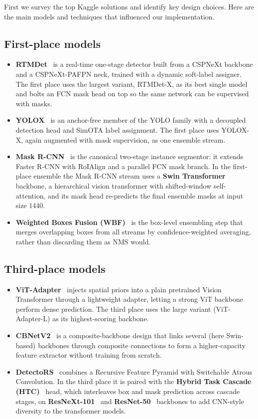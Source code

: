 \documentclass[12pt, a4paper]{article}
\begin{document}
First we survey the top Kaggle solutions and identify key design choices. Here are the main models and techniques that influenced our implementation.

\subsection{First-place models}

\begin{itemize}
    \item \textbf{RTMDet}~\cite{rtmdet} is a real-time one-stage detector built from a CSPNeXt backbone and a CSPNeXt-PAFPN neck, trained with a dynamic soft-label assigner. The first place uses the largest variant, RTMDet-X, as its best single model and bolts an FCN mask head on top so the same network can be supervised with masks.
    \item \textbf{YOLOX}~\cite{yolox} is an anchor-free member of the YOLO family with a decoupled detection head and SimOTA label assignment. The first place uses YOLOX-X, again augmented with mask supervision, as one ensemble stream.
    \item \textbf{Mask R-CNN}~\cite{maskrcnn} is the canonical two-stage instance segmentor: it extends Faster R-CNN with RoIAlign and a parallel FCN mask branch. In the first-place ensemble the Mask R-CNN stream uses a \textbf{Swin Transformer}~\cite{swin} backbone, a hierarchical vision transformer with shifted-window self-attention, and its mask head re-predicts the final ensemble masks at input size $1440$.
    \item \textbf{Weighted Boxes Fusion (WBF)}~\cite{wbf} is the box-level ensembling step that merges overlapping boxes from all streams by confidence-weighted averaging, rather than discarding them as NMS would.
\end{itemize}

\subsection{Third-place models}

\begin{itemize}
    \item \textbf{ViT-Adapter}~\cite{vitadapter} injects spatial priors into a plain pretrained Vision Transformer through a lightweight adapter, letting a strong ViT backbone perform dense prediction. The third place uses the large variant (ViT-Adapter-L) as its highest-scoring backbone.
    \item \textbf{CBNetV2}~\cite{cbnetv2} is a composite-backbone design that links several (here Swin-based) backbones through composite connections to form a higher-capacity feature extractor without training from scratch.
    \item \textbf{DetectoRS}~\cite{detectors} combines a Recursive Feature Pyramid with Switchable Atrous Convolution. In the third place it is paired with the \textbf{Hybrid Task Cascade (HTC)}~\cite{htc} head, which interleaves box and mask prediction across cascade stages, on \textbf{ResNeXt-101}~\cite{resnext} and \textbf{ResNet-50}~\cite{resnet} backbones to add CNN-style diversity to the transformer models.
\end{itemize}
\end{document}
